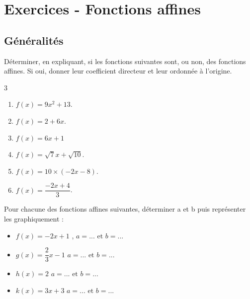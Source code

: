\bigskip

\newpage

\section*{Exercices - Fonctions affines}
{\setlength{\columnseprule}{0pt}
\setcounter{NumEx}{1}

\subsection*{Généralités}


\begin{Exercice} %
Déterminer, en expliquant, si les fonctions suivantes sont, ou non, des fonctions affines. Si oui, donner leur coefficient directeur et leur ordonnée à l'origine.
\vspace{-0.5cm}
\begin{multicols}{3}
\begin{enumerate}

\item $f(x)=9x^{2}+13 $.
\item $f(x)=2 +6  x$.
\item $f(x)=6x+1$
\item $f(x)=\sqrt{7}x + \sqrt{10}$.
\item $f(x)=10\times (-2x-8) $.
\item $f(x)=\dfrac{-2x+4}{3}$.
\end{enumerate}
\end{multicols}
\end{Exercice}



\begin{Exercice} %
\begin{minipage}[c]{0.5\linewidth}
   Pour chacune des fonctions affines suivantes, déterminer a et b puis représenter les graphiquement :
      \begin{itemize}[label=\textcolor{Couleur6}{$\bullet$}]
       \item $f(x)=-2x+1$ , $ a=...\text{ et } b=... $
         \item $g(x)=\dfrac{2}{3}x-1$ $ a=...\text{ et } b=... $
         \item $h(x)=2$ $ a=...\text{ et } b=... $
         \item $k(x)=3x+3$ $ a=...\text{ et } b=... $
      \end{itemize}
\end{minipage} \hfill
\begin{minipage}[c]{0.5\linewidth}
\begin{center}
\end{center}
\end{minipage}
\end{Exercice}}
